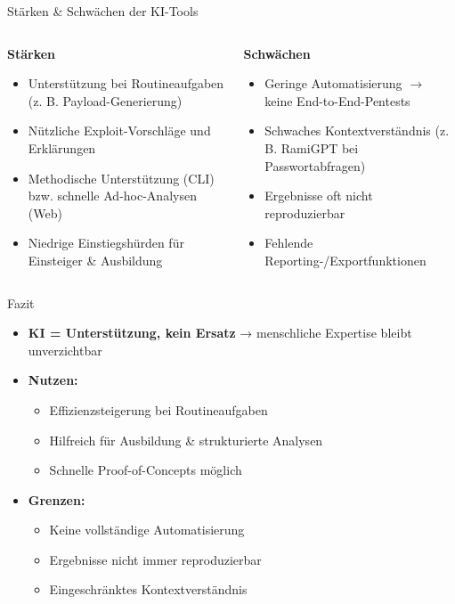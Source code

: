 \documentclass[
	aspectratio=169,	%
	onlytextwidth,		%
	t,					%
	]{beamer}
\begin{document}
\begin{frame}{Stärken \& Schwächen der KI-Tools}
	\begin{columns}[T,onlytextwidth]
		\begin{column}{0.48\textwidth}
			\textbf{Stärken}
			\begin{itemize}
				\item Unterstützung bei Routineaufgaben (z. B. Payload-Generierung)
				\item Nützliche Exploit-Vorschläge und Erklärungen
				\item Methodische Unterstützung (CLI) bzw. schnelle Ad-hoc-Analysen (Web)
				\item Niedrige Einstiegshürden für Einsteiger \& Ausbildung
			\end{itemize}
		\end{column}
		
		\begin{column}{0.48\textwidth}
			\textbf{Schwächen}
			\begin{itemize}
				\item Geringe Automatisierung $\rightarrow$  keine End-to-End-Pentests
				\item Schwaches Kontextverständnis (z. B. RamiGPT bei Passwortabfragen)
				\item Ergebnisse oft nicht reproduzierbar
				\item Fehlende Reporting-/Exportfunktionen
			\end{itemize}
		\end{column}
	\end{columns}
\end{frame}

\begin{frame}{Fazit}
	\begin{itemize}
		\item \textbf{KI = Unterstützung, kein Ersatz}  
		→ menschliche Expertise bleibt unverzichtbar
		
		\item \textbf{Nutzen:}
		\begin{itemize}
			\item Effizienzsteigerung bei Routineaufgaben
			\item Hilfreich für Ausbildung \& strukturierte Analysen
			\item Schnelle Proof-of-Concepts möglich
		\end{itemize}
		
		\item \textbf{Grenzen:}
		\begin{itemize}
			\item Keine vollständige Automatisierung
			\item Ergebnisse nicht immer reproduzierbar
			\item Eingeschränktes Kontextverständnis
		\end{itemize}
	\end{itemize}
\end{frame}
\end{document}
